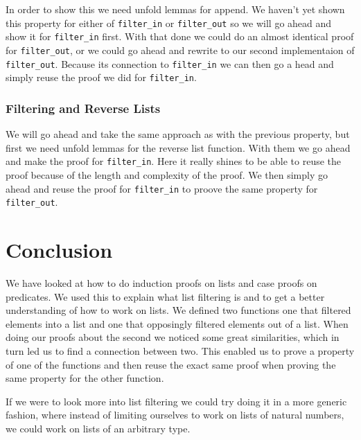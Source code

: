 \documentclass{article}
\begin{document}
In order to show this we need unfold lemmas for append. We haven't yet shown this property for either of \texttt{filter\_in} or \texttt{filter\_out} so we will go ahead and show it for \texttt{filter\_in} first. With that done we could do an almost identical proof for \texttt{filter\_out}, or we could go ahead and rewrite to our second implementaion of \texttt{filter\_out}. Because its connection to \texttt{filter\_in} we can then go a head and simply reuse the proof we did for \texttt{filter\_in}.

\subsubsection{Filtering and Reverse Lists}
We will go ahead and take the same approach as with the previous property, but first we need unfold lemmas for the reverse list function. With them we go ahead and make the proof for \texttt{filter\_in}. Here it really shines to be able to reuse the proof because of the length and complexity of the proof. We then simply go ahead and reuse the proof for \texttt{filter\_in} to proove the same property for \texttt{filter\_out}.

\section{Conclusion}
We have looked at how to do induction proofs on lists and case proofs on predicates. We used this to explain what list filtering is and to get a better understanding of how to work on lists. We defined two functions one that filtered elements into a list and one that opposingly filtered elements out of a list. When doing our proofs about the second we noticed some great similarities, which in turn led us to find a connection between two. This enabled us to prove a property of one of the functions and then reuse the exact same proof when proving the same property for the other function.

If we were to look more into list filtering we could try doing it in a more generic fashion, where instead of limiting ourselves to work on lists of natural numbers, we could work on lists of an arbitrary type.
\end{document}
